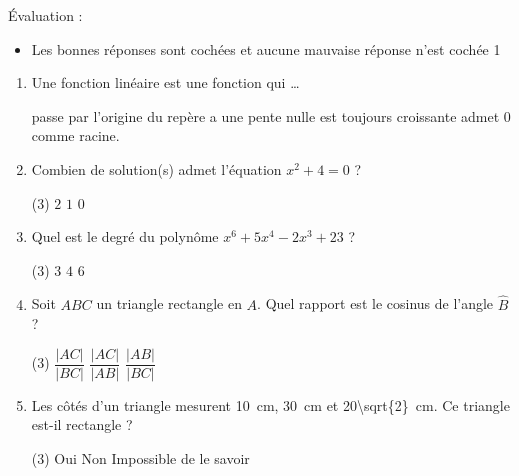 \documentclass[a4paper, 12pt, parskip=half-]{scrartcl}
\begin{document}
\begin{solution}
    Évaluation :
    \begin{itemize}
        \item Les bonnes réponses sont cochées et aucune mauvaise réponse n'est cochée \hfill 1
    \end{itemize}
    \begin{enumerate}
        \item Une fonction linéaire est une fonction qui \dots
              \begin{QCM}
                  \choice[\faCheckSquare] passe par l'origine du repère
                  \choice a une pente nulle
                  \choice est toujours croissante
                  \choice[\faCheckSquare] admet $0$ comme racine.
              \end{QCM}
        \item Combien de solution(s) admet l'équation $x^2+4=0$ ?
              \begin{QCM}(3)
                  \choice $2$
                  \choice $1$
                  \choice[\faCheckSquare] $0$
              \end{QCM}
        \item Quel est le degré du polynôme $x^6 + 5x^4 -2x^3 +23$ ?
              \begin{QCM}(3)
                  \choice $3$
                  \choice $4$
                  \choice[\faCheckSquare] $6$
              \end{QCM}
        \item Soit $ABC$ un triangle rectangle en $A$. Quel rapport est le cosinus de l'angle $\widehat{B}$ ?
              \begin{QCM}(3)
                  \choice $\dfrac{|AC|}{|BC|}$
                  \choice $\dfrac{|AC|}{|AB|}$
                  \choice[\faCheckSquare] $\dfrac{|AB|}{|BC|}$
              \end{QCM}
        \item Les côtés d'un triangle mesurent \SI{10}{cm}, \SI{30}{cm} et \SI{20\sqrt{2}}{cm}. Ce triangle est-il rectangle ?
              \begin{QCM}(3)
                  \choice[\faCheckSquare] Oui
                  \choice Non
                  \choice Impossible de le savoir
              \end{QCM}
    \end{enumerate}
\end{solution}
\vfil
\end{document}
